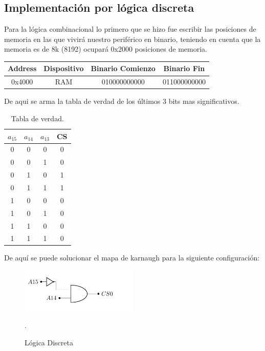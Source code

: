 


\subsection{Implementación por lógica discreta}
Para la lógica combinacional lo primero que se hizo fue escribir las posiciones de memoria en las que vivirá nuestro periférico en binario, teniendo en cuenta que la memoria es de 8k (8192) ocupará 0x2000 posiciones de memoria.
\begin{table}[H]
\centering
\begin{tabular}{|c|c|c|c|}
\hline
Address & Dispositivo & Binario Comienzo & Binario Fin \\ \hline
0x4000 & RAM & 010000000000 & 011000000000 \\ \hline
\end{tabular}
\end{table}
De aqui se arma la tabla de verdad de los últimos 3 bits mas significativos.
\begin{table}[H]
\centering
\begin{tabular}{cccc}
$a_{15}$ & $a_{14}$ & \multicolumn{1}{c|}{$a_{13}$} & CS \\ \hline
0 & 0 & 0 & 0 \\
0 & 0 & 1 & 0 \\
0 & 1 & 0 & 1 \\
0 & 1 & 1 & 1 \\
1 & 0 & 0 & 0 \\
1 & 0 & 1 & 0 \\
1 & 1 & 0 & 0 \\
1 & 1 & 1 & 0
\end{tabular}
\caption{Tabla de verdad.}
\label{tab:truetab}

\end{table}
De aquí se puede solucionar el mapa de karnaugh para la siguiente configuración:
\begin{figure}[H]
  \centering
  \includegraphics[width=0.5\textwidth,page = 1]{ImagenesEjercicio1/Circuits.pdf}
  \caption{Lógica Discreta}.
  \label{fig:circLog}
\end{figure}
